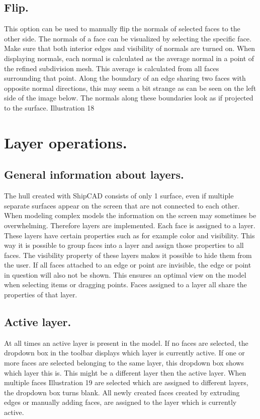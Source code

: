 \documentclass[12pt]{article}
\begin{document}
\subsection{Flip.}
This option can be used to manually flip the normals of selected faces to the other side. The
normals of a face can be visualized by selecting the specific face. Make sure that both interior
edges and visibility of normals are turned on. When displaying normals, each normal is calculated
as the average normal in a point of the refined subdivision mesh. This average is calculated from all
faces surrounding that point. Along the boundary of an edge sharing two faces with opposite normal
directions, this may seem a bit strange as can be seen on the left side of the image below. The
normals along these boundaries look as if projected to the surface.
Illustration 18

\section{Layer operations.}

\subsection{General information about layers.}
The hull created with ShipCAD consists of only 1 surface, even if multiple separate surfaces
appear on the screen that are not connected to each other. When modeling complex models the
information on the screen may sometimes be overwhelming. Therefore layers are implemented.
Each face is assigned to a layer. These layers have certain properties such as for example color
and visibility. This way it is possible to group faces into a layer and assign those properties to all
faces. The visibility property of these layers makes it possible to hide them from the user. If all faces
attached to an edge or point are invisible, the edge or point in question will also not be shown. This
ensures an optimal view on the model when selecting items or dragging points. Faces assigned to a
layer all share the properties of that layer.

\subsection{Active layer.}
At all times an active layer is present in the model. If no
faces are selected, the dropdown box in the toolbar
displays which layer is currently active. If one or more
faces are selected belonging to the same layer, this
dropdown box shows which layer this is. This might be a
different layer then the active layer. When multiple faces
 Illustration 19
are selected which are assigned to different layers, the
dropdown box turns blank. All newly created faces created by extruding edges or manually adding
faces, are assigned to the layer which is currently active.
\end{document}
